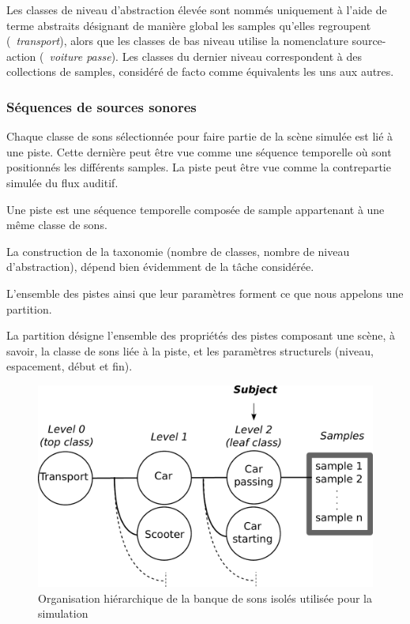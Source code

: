 Les classes de niveau d'abstraction élevée sont nommés uniquement à l'aide de terme abstraits désignant de manière global les samples qu'elles regroupent (\eg~\emph{transport}), alors que les classes de bas niveau utilise la nomenclature source-action (\eg~\emph{voiture passe}). Les classes du dernier niveau correspondent à des collections de samples, considéré de facto comme équivalents les uns aux autres.

\subsubsection{Séquences de sources sonores}

Chaque classe de sons sélectionnée pour faire partie de la scène simulée est lié à une piste. Cette dernière peut être vue comme une séquence temporelle où sont positionnés les différents samples. La piste peut être vue comme la contrepartie simulée du flux auditif.

\begin{mydef}
Une piste est une séquence temporelle composée de sample appartenant à une même classe de sons.
\end{mydef}

La construction de la taxonomie (nombre de classes, nombre de niveau d'abstraction), dépend bien évidemment de la tâche considérée. 

L'ensemble des pistes ainsi que leur paramètres forment ce que nous appelons une partition.

\begin{mydef}
La partition désigne l'ensemble des propriétés des pistes composant une scène, à savoir, la classe de sons liée à la piste, et les paramètres structurels (niveau, espacement, début et fin).
\end{mydef}

\begin{figure}[bth]
        \myfloatalign
        \includegraphics[width=.8\linewidth]{gfx/3}
       \caption{Organisation hiérarchique de la banque de sons isolés utilisée pour la simulation}\label{fig:orgDb}
\end{figure}


